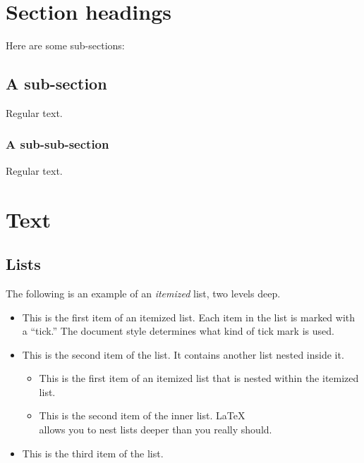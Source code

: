 \documentclass[aoas]{imsart}
\providecommand{\tightlist}{%
  \setlength{\itemsep}{0pt}\setlength{\parskip}{0pt}}
\numberwithin{equation}{section}
\theoremstyle{plain}
\theoremstyle{remark}
\begin{document}
\hypertarget{section-headings}{%
\section{Section headings}\label{section-headings}}

Here are some sub-sections:

\hypertarget{a-sub-section}{%
\subsection{A sub-section}\label{a-sub-section}}

Regular text.

\hypertarget{a-sub-sub-section}{%
\subsubsection{A sub-sub-section}\label{a-sub-sub-section}}

Regular text.

\hypertarget{text}{%
\section{Text}\label{text}}

\hypertarget{lists}{%
\subsection{Lists}\label{lists}}

The following is an example of an \emph{itemized} list, two levels deep.

\begin{itemize}
\tightlist
\item
  This is the first item of an itemized list. Each item in the list is
  marked with a ``tick.'' The document style determines what kind of
  tick mark is used.
\item
  This is the second item of the list. It contains another list nested
  inside it.

  \begin{itemize}
  \tightlist
  \item
    This is the first item of an itemized list that is nested within the
    itemized list.
  \item
    This is the second item of the inner list. \LaTeX\\
    allows you to nest lists deeper than you really should.
  \end{itemize}
\item
  This is the third item of the list.
\end{itemize}
\end{document}
